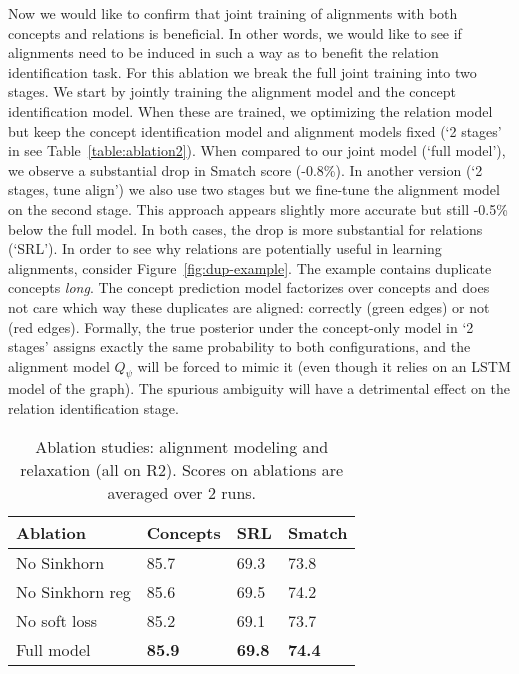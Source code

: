 \documentclass[11pt,a4paper]{article}
\begin{document}
Now we would like to confirm  that joint training of alignments with both concepts and relations is beneficial. In other words,
we would like to see if alignments need to be induced in such a way as to benefit the relation identification task.
For this ablation
we break the full joint training into two stages.
We start by jointly training the alignment model and the concept identification model. When these are trained, we  optimizing the relation model   but keep the concept identification model and alignment models fixed (`2 stages' in see Table~\ref{table:ablation2}). When compared to our joint model (`full model'),  we observe a substantial drop in Smatch score (-0.8\%). In another version (`2 stages, tune align') we also use two stages but we fine-tune the alignment model on the second stage. This approach appears slightly more accurate but still -0.5\% below the full model.  In both cases, the drop is more substantial for relations (`SRL').
In order to see why relations are potentially useful in learning alignments, consider  Figure~\ref{fig:dup-example}. The example contains duplicate concepts \textit{long}. The concept prediction model factorizes over concepts and does not care which way these duplicates are aligned: correctly (green edges) or not (red edges). Formally, the true posterior under the concept-only model in `2 stages' assigns exactly the same probability to both configurations, and the alignment model $Q_{\psi}$  will be forced to mimic it (even though it relies on an LSTM model of the graph). The spurious ambiguity will have a detrimental effect on the relation identification stage.

\begin{table}[t]
    \begin{center} 
        \begin{tabular}{llll} 
            \hline  Ablation   &   Concepts &    SRL   & Smatch \\\hline
            No Sinkhorn     &85.7& 69.3&73.8\\
            No Sinkhorn reg     &85.6& 69.5&74.2\\ 
            No soft loss      & 85.2 & 69.1& 73.7\\
            Full model     &\bf85.9& \bf69.8& {\bf 74.4}\\
            \hline
        \end{tabular}
    \end{center}
    \vspace{-2ex}
	\caption{\label{table:ablation3} Ablation studies: alignment modeling and relaxation (all on R2). Scores on ablations are averaged over 2 runs. 
    }
    \vspace{-2ex}
\end{table}
\end{document}

